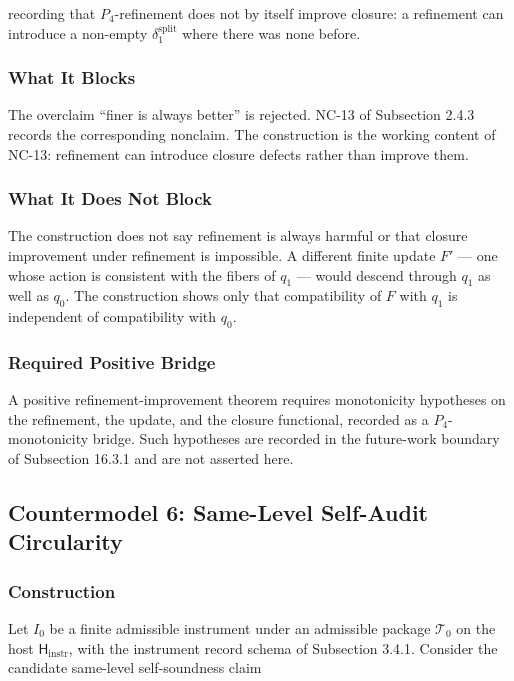 \documentclass[11pt]{article}
\theoremstyle{definition}
\begin{document}
recording that \(P_4\)-refinement does not by itself improve closure: a refinement can introduce a non-empty \(\delta_1^{\mathrm{split}}\) where there was none before.

\subsubsection{What It Blocks}

The overclaim ``finer is always better'' is rejected. NC-13 of Subsection 2.4.3 records the corresponding nonclaim. The construction is the working content of NC-13: refinement can introduce closure defects rather than improve them.

\subsubsection{What It Does Not Block}

The construction does not say refinement is always harmful or that closure improvement under refinement is impossible. A different finite update \(F'\) --- one whose action is consistent with the fibers of \(q_1\) --- would descend through \(q_1\) as well as \(q_0\). The construction shows only that compatibility of \(F\) with \(q_1\) is independent of compatibility with \(q_0\).

\subsubsection{Required Positive Bridge}

A positive refinement-improvement theorem requires monotonicity hypotheses on the refinement, the update, and the closure functional, recorded as a \(P_4\)-monotonicity bridge. Such hypotheses are recorded in the future-work boundary of Subsection 16.3.1 and are not asserted here.

\subsection{Countermodel 6: Same-Level Self-Audit Circularity}

\subsubsection{Construction}

Let \(I_0\) be a finite admissible instrument under an admissible package \(\mathcal T_0\) on the host \(\mathsf H_{\mathrm{instr}}\), with the instrument record schema of Subsection 3.4.1. Consider the candidate same-level self-soundness claim
\end{document}
